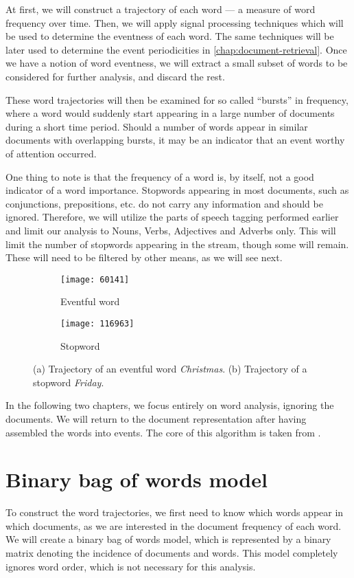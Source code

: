 At first, we will construct a trajectory of each word --- a measure of word frequency over time. Then, we will apply signal processing techniques which will be used to determine the eventness of each word. The same techniques will be later used to determine the event periodicities in \autoref{chap:document-retrieval}. Once we have a notion of word eventness, we will extract a small subset of words to be considered for further analysis, and discard the rest.

These word trajectories will then be examined for so called ``bursts'' in frequency, where a word would suddenly start appearing in a large number of documents during a short time period. Should a number of words appear in similar documents with overlapping bursts, it may be an indicator that an event worthy of attention occurred.

One thing to note is that the frequency of a word is, by itself, not a good indicator of a word importance.
Stopwords appearing in most documents, such as conjunctions, prepositions, etc. do not carry any information and should be ignored. Therefore, we will utilize the parts of speech tagging performed earlier and limit our analysis to Nouns, Verbs, Adjectives and Adverbs only. This will limit the number of stopwords appearing in the stream, though some will remain. These will need to be filtered by other means, as we will see next.

\begin{figure}
\centering
\begin{subfigure}{.5\textwidth}
  \centering
  \texttt{[image: 60141]}  %
  \caption{Eventful word}
  \label{fig:vanoce}
\end{subfigure}%
\begin{subfigure}{.5\textwidth}
  \centering
  \texttt{[image: 116963]}  %
  \caption{Stopword}
  \label{fig:patek}
\end{subfigure}
\caption{(a) Trajectory of an eventful word \textit{Christmas}. (b) Trajectory of a stopword \textit{Friday}.}
\end{figure}

In the following two chapters, we focus entirely on word analysis, ignoring the documents. We will return to the document representation after having assembled the words into events. The core of this algorithm is taken from \cite{event-detection}.


\section{Binary bag of words model}
To construct the word trajectories, we first need to know which words appear in which documents, as we are interested in the document frequency of each word. We will create a binary bag of words model, which is represented by a binary matrix denoting the incidence of documents and words. This model completely ignores word order, which is not necessary for this analysis.

